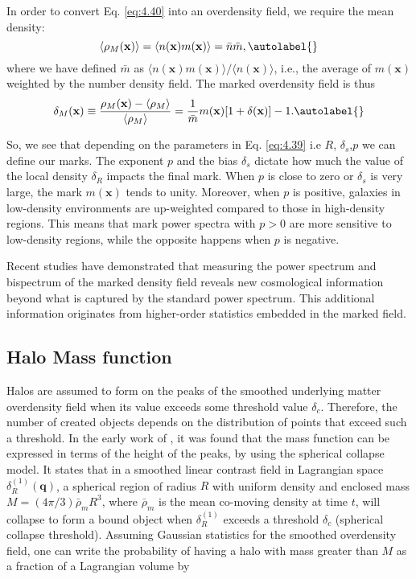 In order to convert Eq. \eqref{eq:4.40} into an overdensity field, we require the mean density:
\begin{equation}
    \left\langle\rho_M(\mathbf{x})\right\rangle=\langle n(\mathbf{x}) m(\mathbf{x})\rangle=\bar{n} \bar{m},\autolabel{}
\end{equation}
where we have defined $\bar{m}$ as $\langle n(\mathbf{x}) m(\mathbf{x})\rangle /\langle n(\mathbf{x})\rangle$, i.e., the average of $m(\mathbf{x})$ weighted by the number density field. The marked overdensity field is thus
\begin{equation}
    \delta_M(\mathbf{x}) \equiv \frac{\rho_M(\mathbf{x})-\left\langle\rho_M\right\rangle}{\left\langle\rho_M\right\rangle}=\frac{1}{\bar{m}} m(\mathbf{x})[1+\delta(\mathbf{x})]-1.\autolabel{}
\end{equation}

So, we see that depending on the parameters in Eq. \eqref{eq:4.39} i.e $R$, $\delta_s$,$p$ we can define our marks. The exponent $ p $ and the bias $ \delta_s $ dictate how much the value of the local density $ \delta_R $ impacts the final mark. When $ p $ is close to zero or $ \delta_s $ is very large, the mark $ m(\mathbf{x}) $ tends to unity. Moreover, when $ p $ is positive, galaxies in low-density environments are up-weighted compared to those in high-density regions. This means that mark power spectra with $ p > 0 $ are more sensitive to low-density regions, while the opposite happens when $ p $ is negative.

Recent studies have demonstrated that measuring the power spectrum \cite{Massara_2021, Massara_2023} and bispectrum \cite{jung2024quijotepngoptimizingsummarystatistics} of the marked density field reveals new cosmological information beyond what is captured by the standard power spectrum. This additional information originates from higher-order statistics embedded in the marked field.



\subsection*{Halo Mass function}
Halos are assumed to form on the peaks of the smoothed underlying matter overdensity field when its value exceeds some threshold value $\delta_{c}$. Therefore, the number of created objects depends on the distribution of points that exceed such a threshold. In the early work of \cite{press1974ApJ...187..425P}, it was found that the mass function can be expressed in terms of the height of the peaks, by using the spherical collapse model. It states that in a smoothed linear contrast field in Lagrangian space $\delta_{R}^{(1)}(\mathbf{q})$, a spherical region of radius $R$ with uniform density and enclosed mass $M=(4 \pi / 3) \bar{\rho}_{m} R^{3}$, where $\bar{\rho}_{m}$ is the mean co-moving density at time $t$, will collapse to form a bound object when $\delta_{R}^{(1)}$ exceeds a threshold $\delta_{c}$ (spherical collapse threshold). Assuming Gaussian statistics for the smoothed overdensity field, one can write the probability of having a halo with mass greater than $M$ as a fraction of a Lagrangian volume by


